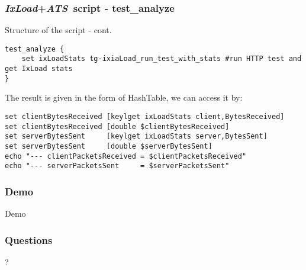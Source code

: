 \documentclass{beamer}
\newcommand{\ixload}{\emph{IxLoad}}
\newcommand{\ats}{\emph{ATS}}
\begin{document}
\begin{frame}[fragile] \frametitle{\ixload+\ats~script - test\_analyze}
\begin{block}{Structure of the script - cont.}
\begin{lstlisting}[language=TclUlisses]
test_analyze {
	set ixLoadStats tg-ixiaLoad_run_test_with_stats #run HTTP test and get IxLoad stats
}
\end{lstlisting}
\end{block}
The result is given in the form of HashTable, we can access it by:
\begin{lstlisting}[language=TclUlisses]
set clientBytesReceived [keylget ixLoadStats client,BytesReceived]
set clientBytesReceived [double $clientBytesReceived]
set serverBytesSent     [keylget ixLoadStats server,BytesSent]
set serverBytesSent     [double $serverBytesSent]
echo "--- clientPacketsReceived = $clientPacketsReceived"
echo "--- serverPacketsSent     = $serverPacketsSent"
\end{lstlisting}
\end{frame}

\begin{frame} \frametitle{Demo}
	\begin{center}\huge{Demo}\end{center}
\end{frame}

\begin{frame} \frametitle{Questions}
	\begin{center}\huge{?}\end{center}
\end{frame}
\end{document}
